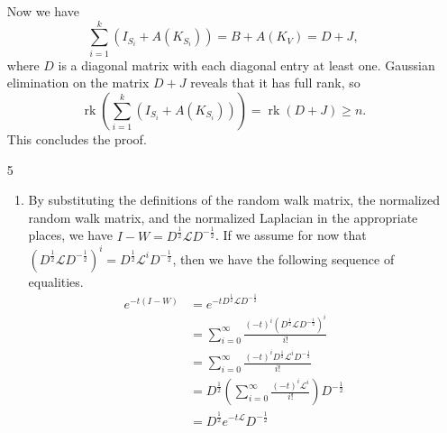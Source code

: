 \documentclass{article}
\newcommand{\1}{\mathbf{1}}
\newcommand{\0}{\mathbf{0}}
\renewcommand{\L}{\mathcal{L}}
\DeclareMathOperator{\rk}{rk}
\begin{document}
\begin{enumerate}
  Now we have
  \begin{equation*}
    \sum_{i = 1}^k (I_{S_i} + A(K_{S_i})) = B + A(K_V) = D + J,
  \end{equation*}
  where $D$ is a diagonal matrix with each diagonal entry at least one.
  Gaussian elimination on the matrix $D + J$ reveals that it has full rank, so
  \begin{equation*}
    \rk\left(\sum_{i = 1}^k (I_{S_i} + A(K_{S_i}))\right) = \rk(D + J) \geq n.
  \end{equation*}
  This concludes the proof.
\item[5]
  \begin{enumerate}
  \item
    By substituting the definitions of the random walk matrix, the normalized random walk matrix, and the normalized Laplacian in the appropriate places, we have $I - W = D^{\frac{1}{2}} \L D^{-\frac{1}{2}}$.
    If we assume for now that $(D^{\frac{1}{2}} \L D^{-\frac{1}{2}})^i = D^{\frac{1}{2}} \L^i D^{-\frac{1}{2}}$, then we have the following sequence of equalities.
    \begin{align*}
      e^{-t(I - W)} & = e^{-t D^{\frac{1}{2}} \L D^{-\frac{1}{2}}} \\
      & = \sum_{i = 0}^\infty \frac{(-t)^i (D^{\frac{1}{2}} \L D^{-\frac{1}{2}})^i}{i!} \\
      & = \sum_{i = 0}^\infty \frac{(-t)^i D^{\frac{1}{2}} \L^i D^{-\frac{1}{2}}}{i!} \\
      & = D^{\frac{1}{2}} \left(\sum_{i = 0}^\infty \frac{(-t)^i \L^i}{i!}\right) D^{-\frac{1}{2}} \\
      & = D^{\frac{1}{2}} e^{-t \L} D^{-\frac{1}{2}}
    \end{align*}


\end{enumerate}
\end{enumerate}
\end{document}
